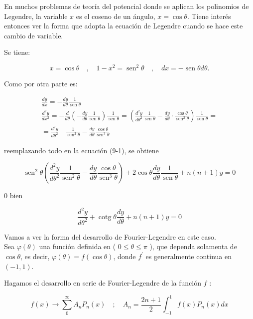 \documentclass[10pt]{article}
\theoremstyle{plain}
\theoremstyle{definition}
\theoremstyle{remark}
\begin{document}
En muchos problemas de teoría del potencial donde se aplican los polinomios de Legendre, la variable $x$ es el coseno de un ángulo, $x=\cos \theta$. Tiene interés entonces ver la forma que adopta la ecuación de Legendre cuando se hace este cambio de variable.

Se tiene:

$$
x=\cos \theta \quad, \quad 1-x^{2}=\operatorname{sen}^{2} \theta \quad, \quad d x=-\operatorname{sen} \theta d \theta .
$$

Como por otra parte es:

$$
\begin{gathered}
\frac{d y}{d x}=-\frac{d y}{d \theta} \frac{1}{\operatorname{sen} \theta} \\
\frac{d^{2} y}{d x^{2}}=-\frac{d}{d \theta}\left(-\frac{d y}{d \theta} \frac{1}{\operatorname{sen} \theta}\right) \frac{1}{\operatorname{sen} \theta}=\left(\frac{d^{2} y}{d \theta^{2}} \frac{1}{\operatorname{sen} \theta}-\frac{d y}{d \theta} \cdot \frac{\cos \theta}{\operatorname{sen}^{2} \theta}\right) \frac{1}{\operatorname{sen} \theta}= \\
=\frac{d^{2} y}{d \theta^{2}} \quad \frac{1}{\operatorname{sen}^{2} \theta}-\frac{d y}{d \theta} \frac{\cos \theta}{\operatorname{sen}^{3} \theta}
\end{gathered}
$$

reemplazando todo en la ecuación (9-1), se obtiene

$$
\operatorname{sen}^{2} \theta\left(\frac{d^{2} y}{d \theta^{2}} \frac{1}{\operatorname{sen}^{2} \theta}-\frac{d y}{d \theta} \frac{\cos \theta}{\operatorname{sen}^{3} \theta}\right)+2 \cos \theta \frac{d y}{d \theta} \frac{1}{\operatorname{sen} \theta}+n(n+1) y=0
$$

0 bien


\begin{equation*}
\frac{d^{2} y}{d \theta^{2}}+\operatorname{cotg} \theta \frac{d y}{d \theta}+n(n+1) y=0 \tag{9-11}
\end{equation*}


Vamos a ver la forma del desarrollo de Fourier-Legendre en este caso.\\
Sea $\varphi(\theta)$ una función definida en ( $0 \leqslant \theta \leqslant \pi$ ), que dependa solamenta de $\cos \theta$, es decir, $\varphi(\theta)=f(\cos \theta)$, donde $f^{\prime}$ es generalmente continua en $(-1,1)$.

Hagamos el desarrollo en serie de Fourier-Legendre de la función $f$ :

$$
f(x) \rightarrow \sum_{0}^{\infty} A_{n} P_{n}(x) \quad ; \quad A_{n}=\frac{2 n+1}{2} \int_{-1}^{1} f(x) P_{n}(x) d x
$$
\end{document}
